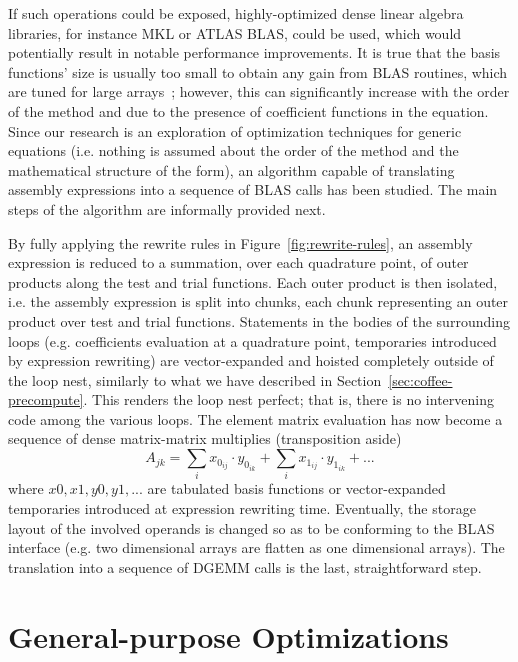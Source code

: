 If such operations could be exposed, highly-optimized dense linear algebra libraries, for instance MKL or ATLAS BLAS, could be used, which would potentially result in notable performance improvements. It is true that the basis functions' size is usually too small to obtain any gain from BLAS routines, which are tuned for large arrays~\citep{nek5000}; however, this can significantly increase with the order of the method and due to the presence of coefficient functions in the equation. Since our research is an exploration of optimization techniques for generic equations (i.e. nothing is assumed about the order of the method and the mathematical structure of the form), an algorithm capable of translating assembly expressions into a sequence of BLAS calls has been studied. The main steps of the algorithm are informally provided next. 

By fully applying the rewrite rules in Figure~\ref{fig:rewrite-rules}, an assembly expression is reduced to a summation, over each quadrature point, of outer products along the test and trial functions. Each outer product is then isolated, i.e. the assembly expression is split into chunks, each chunk representing an outer product over test and trial functions. Statements in the bodies of the surrounding loops (e.g. coefficients evaluation at a quadrature point, temporaries introduced by expression rewriting) are vector-expanded and hoisted completely outside of the loop nest, similarly to what we have described in Section~\ref{sec:coffee-precompute}. This renders the loop nest perfect; that is, there is no intervening code among the various loops. The element matrix evaluation has now become a sequence of dense matrix-matrix multiplies (transposition aside)
\begin{equation*}
A_{jk} = \sum_{i} x_{0_{ij}} \cdot y_{0_{ik}} + \sum_{i} x_{1_{ij}} \cdot y_{1_{ik}} + ...
\end{equation*}
where $x0, x1, y0, y1, ...$ are tabulated basis functions or vector-expanded temporaries introduced at expression rewriting time. Eventually, the storage layout of the involved operands is changed so as to be conforming to the BLAS interface (e.g. two dimensional arrays are flatten as one dimensional arrays). The translation into a sequence of DGEMM calls is the last, straightforward step. 

\section{General-purpose Optimizations}
\label{sec:coffee-genpurp-opts}

